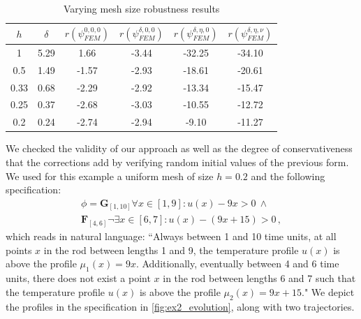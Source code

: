 \documentclass[letterpaper, 10 pt, conference]{ieeeconf/ieeeconf}
\newcommand{\Always}{\mathbf{G}}
\newcommand{\Event}{\mathbf{F}}
\begin{document}
\begin{table}
\centering
\caption{Varying mesh size robustness results}
\label{tab:res_meshes}
\begin{tabular}{|c|c|c|c|c|c|}
    \hline
    $h$ & $\delta$ & $r(\psi_{FEM}^{0, 0, 0})$ & $r(\psi_{FEM}^{\delta, 0, 0})$ &
    $r(\psi_{FEM}^{\delta, \eta, 0})$ & $r(\psi_{FEM}^{\delta, \eta,
\nu})$ \\
    \hline
    1 & 5.29 & 1.66 & -3.44 & -32.25 & -34.10 \\
    0.5 & 1.49 & -1.57 & -2.93 & -18.61 & -20.61 \\
    0.33 & 0.68 & -2.29 & -2.92 & -13.34 & -15.47 \\
    0.25 & 0.37 & -2.68 & -3.03 & -10.55 & -12.72 \\
    0.2 & 0.24 & -2.74 & -2.94 & -9.10 & -11.27 \\
    \hline
\end{tabular}
\end{table}

We checked the validity of our approach as well as the degree of
conservativeness that the corrections add by verifying random initial values
of the previous form. We used for this example a uniform mesh of size $h = 0.2$
and the following specification: 
%
\begin{multline}
        \phi = \Always_{[1, 10]} \forall x \in [1, 9]: u(x) - 9x > 0 \ \land \\
        \Event_{[4, 6]} \lnot \exists x \in [6, 7]: u(x) - (9x + 15) > 0 \,,
\end{multline}
%
which reads in natural language: ``Always between 1 and 10 time units, at all
points $x$ in the rod between lengths 1 and 9, the temperature profile $u(x)$ is above the
profile $\mu_1(x) = 9x$. Additionally, eventually between 4 and 6 time units,
there does not exist a point $x$ in the rod between lengths 6 and 7 such that the
temperature profile $u(x)$ is above the profile $\mu_2(x) = 9x + 15$." We depict the
profiles in the specification in \cref{fig:ex2_evolution}, along with two
trajectories.
\end{document}
